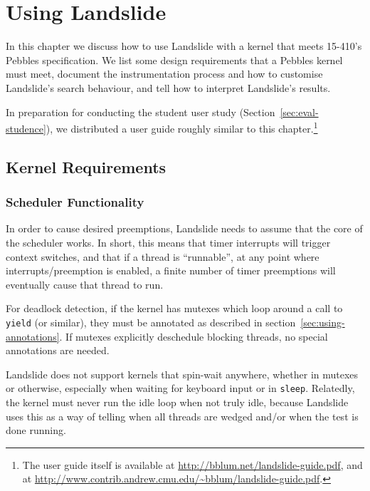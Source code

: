 \chapter{Using Landslide}
\label{sec:using}

In this chapter we discuss how to use Landslide with a kernel that meets 15-410's Pebbles specification. We list some design requirements that a Pebbles kernel must meet, document the instrumentation process and how to customise Landslide's search behaviour, and tell how to interpret Landslide's results.

In preparation for conducting the student user study (Section~\ref{sec:eval-studence}), we distributed a user guide roughly similar to this chapter.\footnote{
The user guide itself is available at \url{http://bblum.net/landslide-guide.pdf}, and at \url{http://www.contrib.andrew.cmu.edu/~bblum/landslide-guide.pdf}.}

\section{Kernel Requirements}
\label{sec:using-requirements}

\subsection{Scheduler Functionality}
\label{sec:using-requirements-sched}

In order to cause desired preemptions, Landslide needs to assume that the core of the scheduler works. In short, this means that timer interrupts will trigger context switches, and that if a thread is ``runnable'', at any point where interrupts/preemption is enabled, a finite number of timer preemptions will eventually cause that thread to run.

For deadlock detection, if the kernel has mutexes which loop around a call to \texttt{yield} (or similar), they must be annotated as described in section~\ref{sec:using-annotations}. If mutexes explicitly deschedule blocking threads, no special annotations are needed.

Landslide does not support kernels that spin-wait anywhere, whether in mutexes or otherwise, especially when waiting for keyboard input or in \texttt{sleep}. Relatedly, the kernel must never run the idle loop when not truly idle, because Landslide uses this as a way of telling when all threads are wedged and/or when the test is done running.

